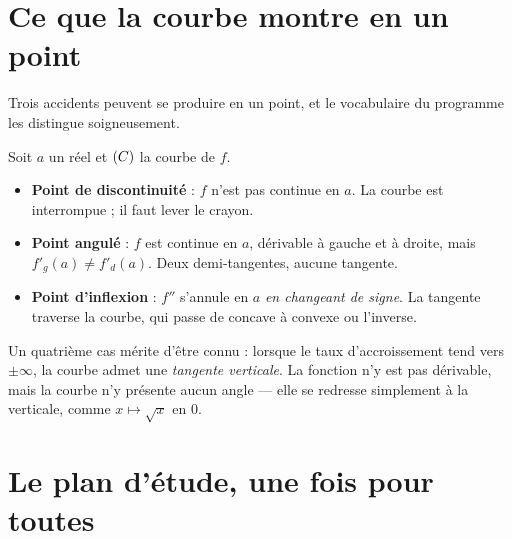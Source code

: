 \section{Ce que la courbe montre en un point}

Trois accidents peuvent se produire en un point, et le vocabulaire du
programme les distingue soigneusement.

\begin{definition}
Soit $a$ un réel et $(C)$ la courbe de $f$.
\begin{itemize}[leftmargin=1.4em, itemsep=0.25em]
  \item \textbf{Point de discontinuité} : $f$ n'est pas continue en $a$. La
        courbe est interrompue ; il faut lever le crayon.
  \item \textbf{Point angulé} : $f$ est continue en $a$, dérivable à gauche et
        à droite, mais $f'_{g}(a) \neq f'_{d}(a)$. Deux demi-tangentes,
        aucune tangente.
  \item \textbf{Point d'inflexion} : $f''$ s'annule en $a$ \emph{en changeant
        de signe}. La tangente traverse la courbe, qui passe de concave à
        convexe ou l'inverse.
\end{itemize}
\end{definition}

\begin{remarque}
Un quatrième cas mérite d'être connu : lorsque le taux d'accroissement tend
vers $\pm\infty$, la courbe admet une \emph{tangente verticale}. La fonction
n'y est pas dérivable, mais la courbe n'y présente aucun angle — elle se
redresse simplement à la verticale, comme $x \mapsto \sqrt{x}$ en $0$.
\end{remarque}

\section{Le plan d'étude, une fois pour toutes}

